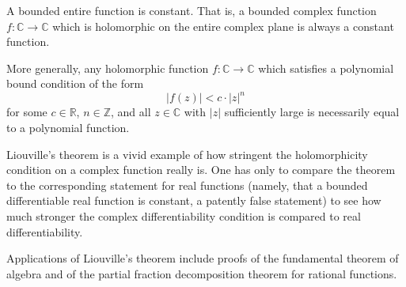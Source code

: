 \documentclass{article}
\begin{document}
A bounded entire function is constant. That is, a bounded complex function $f: \mathbb{C} \to \mathbb{C}$ which is holomorphic on the entire complex plane is always a constant function.

More generally, any holomorphic function $f: \mathbb{C} \to \mathbb{C}$ which satisfies a polynomial bound condition of the form
$$
|f(z)| < c \cdot |z|^n
$$
for some $c \in \mathbb{R}$, $n \in \mathbb{Z}$, and all $z \in \mathbb{C}$ with $|z|$ sufficiently large is necessarily equal to a polynomial function.

Liouville's theorem is a vivid example of how stringent the holomorphicity condition on a complex function really is. One has only to compare the theorem to the corresponding statement for real functions (namely, that a bounded differentiable real function is constant, a patently false statement) to see how much stronger the complex differentiability condition is compared to real differentiability.

Applications of Liouville's theorem include proofs of the fundamental theorem of algebra and of the partial fraction decomposition theorem for rational functions.
\end{document}

